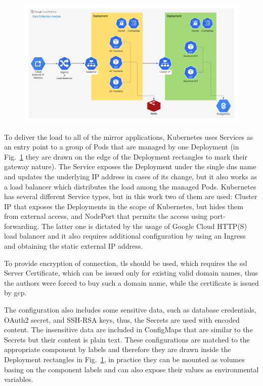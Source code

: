 \begin{figure}
    \includegraphics[width=\linewidth]{resources/gcp_diagram}
    \label{fig:gcp_diagram}
\end{figure}

To deliver the load to all of the mirror applications, Kubernetes uses Services as an entry point to a group of Pods that are managed by one Deployment (in Fig.~\ref{fig:gcp_diagram} they are drawn on the edge of the Deployment rectangles to mark their gateway nature).
The Service exposes the Deployment under the single \gls{dns} name and updates the underlying IP address in cases of its change, but it also works as a load balancer which distributes the load among the managed Pods.
Kubernetes has several different Service types, but in this work two of them are used: Cluster IP that exposes the Deployments in the scope of Kubernetes, but hides them from external access, and NodePort that permits the access using port-forwarding.
The latter one is dictated by the usage of Google Cloud HTTP(S) load balancer and it also requires additional configuration by using an Ingress and obtaining the static external IP address.

To provide encryption of connection, \gls{tls} should be used, which requires the \gls{ssl} Server Certificate, which can be issued only for existing valid domain names, thus the authors were forced to buy such a domain name, while the certificate is issued by \gls{gcp}.

The configuration also includes some sensitive data, such as database credentials, OAuth2 secret, and SSH-RSA keys, thus, the Secrets are used with encoded content.
The insensitive data are included in ConfigMaps that are similar to the Secrets but their content is plain text.
These configurations are matched to the appropriate component by labels and therefore they are drawn inside the Deployment rectangles in Fig.~\ref{fig:gcp_diagram}, in practice they can be mounted as volumes basing on the component labels and can also expose their values as environmental variables.

